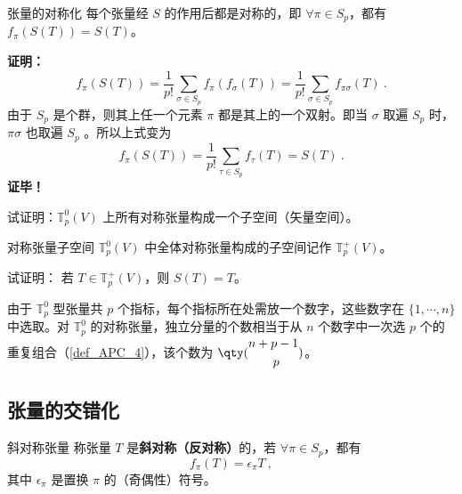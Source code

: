 \begin{theorem}{张量的对称化}
每个张量经 $S$ 的作用后都是对称的，即 $\forall \pi\in S_p$，都有 $f_\pi(S(T))=S(T)$。
\end{theorem}
\textbf{证明：}
\begin{equation}
f_\pi(S(T))=\frac{1}{p!}\sum_{\sigma\in S_p} f_\pi(f_\sigma(T))=\frac{1}{p!}\sum_{\sigma\in S_p} f_{\pi\sigma}(T)~.
\end{equation}
由于 $S_p$ 是个群，则其上任一个元素 $\pi$ 都是其上的一个双射。即当 $\sigma$ 取遍 $S_p$ 时，$\pi\sigma$ 也取遍 $S_p$ 。所以上式变为
\begin{equation}
f_\pi(S(T))=\frac{1}{p!}\sum_{\tau\in S_p} f_{\tau}(T)=S(T)~.
\end{equation}
\textbf{证毕！}

\begin{exercise}{}
试证明：$\mathbb{T}_p^0(V)$ 上所有对称张量构成一个子空间（矢量空间）。
\end{exercise}
\begin{definition}{对称张量子空间}
$\mathbb{T}_p^0(V)$ 中全体对称张量构成的子空间记作 $\mathbb{T}_p^+(V)$。
\end{definition}
\begin{exercise}{}
试证明： 若 $T\in\mathbb{T}_p^+(V)$，则 $S(T)=T$。
\end{exercise}

由于 $\mathbb{T}_p^0$ 型张量共 $p$ 个指标，每个指标所在处需放一个数字，这些数字在 $\{1,\cdots,n\}$ 中选取。对 $\mathbb{T}_p^0$ 的对称张量，独立分量的个数相当于从 $n$ 个数字中一次选 $p$ 个的重复组合（\autoref{def_APC_4}），该个数为 $\qty(\begin{aligned}
&n+p-1\\&\qquad p
\end{aligned})$。
\subsection{张量的交错化}
\begin{definition}{斜对称张量}
称张量 $T$ 是\textbf{斜对称（反对称）}的，若 $\forall \pi\in S_p$，都有
\begin{equation}\label{eq_SIofTe_4}
f_\pi(T)=\epsilon_\pi T~,
\end{equation}
其中 $\epsilon_\pi$ 是置换 $\pi$ 的（奇偶性）符号。
\end{definition}

